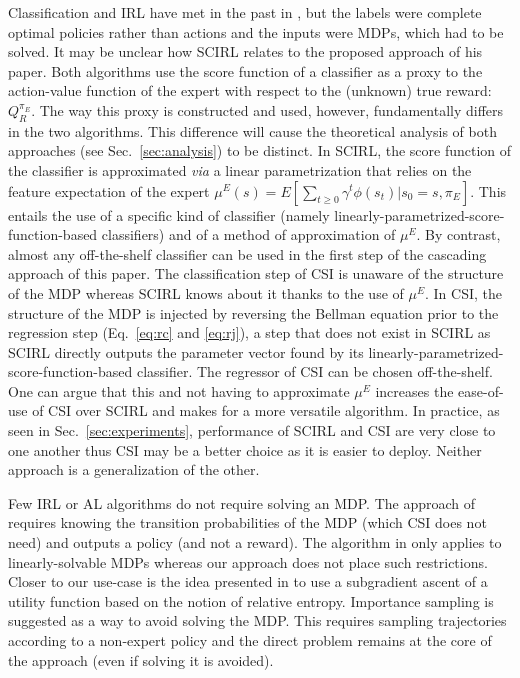\documentclass{llncs}
\begin{document}
Classification and IRL have met in the past in \cite{ratliff2006maximum}, but the labels were complete optimal policies rather than actions and the inputs were MDPs, which had to be solved. It may be unclear how SCIRL \cite{klein2012scirl} relates to the proposed approach of his paper. Both algorithms use the score function of a classifier as a proxy to the action-value function of the expert with respect to the (unknown) true reward: $Q^{\pi_E}_R$. The way this proxy is constructed and used, however, fundamentally differs in the two algorithms. This difference will cause the theoretical analysis of both approaches (see Sec.~\ref{sec:analysis}) to be distinct. In SCIRL, the score function of the classifier is approximated {\it via} a linear parametrization that relies on the feature expectation of the expert $\mu^E(s) = E[\sum_{t\geq 0}\gamma^t\phi(s_t)|s_0=s,\pi_E]$. This entails the use of a specific kind of classifier (namely linearly-parametrized-score-function-based classifiers) and of a method of approximation of $\mu^E$. By contrast, almost any off-the-shelf classifier can be used in the first step of the cascading approach of this paper. The classification step of CSI is unaware of the structure of the MDP whereas SCIRL knows about it thanks to the use of $\mu^E$. In CSI, the structure of the MDP is injected by reversing the Bellman equation prior to the regression step (Eq.~\ref{eq:rc} and \eqref{eq:rj}), a step that does not exist in SCIRL as SCIRL directly outputs the parameter vector found by its linearly-parametrized-score-function-based classifier. The regressor of CSI can be chosen off-the-shelf. One can argue that this and not having to approximate $\mu^E$ increases the ease-of-use of CSI over SCIRL and makes for a more versatile algorithm. In practice, as seen in Sec.~\ref{sec:experiments}, performance of SCIRL and CSI are very close to one another thus CSI may be a better choice as it is easier to deploy. Neither approach is a generalization of the other.

Few IRL or AL algorithms do not require solving an MDP. The approach of \cite{syed2008apprenticeship} requires knowing the transition probabilities of the MDP (which CSI does not need) and outputs a policy (and not a reward). The algorithm in \cite{dvijotham2010inverse} only applies to linearly-solvable MDPs whereas our approach does not place such restrictions. Closer to our use-case is the idea presented in \cite{boularias2011relative} to use a subgradient ascent of a utility function based on the notion of relative entropy. Importance sampling is suggested as a way to avoid solving the MDP. This requires sampling trajectories according to a non-expert policy and
the direct problem remains at the core of the approach (even if
solving it is avoided).
\end{document}
